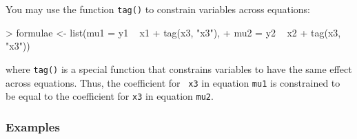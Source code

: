 \documentclass{article}
\begin{document}
You may use the function {\tt tag()} to constrain variables across
equations:
\begin{Schunk}
\begin{Sinput}
> formulae <- list(mu1 = y1 ~ x1 + tag(x3, "x3"), 
+                  mu2 = y2 ~ x2 + tag(x3, "x3"))
\end{Sinput}
\end{Schunk}
where {\tt tag()} is a special function that constrains variables to
have the same effect across equations.  Thus, the coefficient for {\tt
x3} in equation {\tt mu1} is constrained to be equal to the
coefficient for {\tt x3} in equation {\tt mu2}.  

\subsubsection{Examples}
\end{document}
